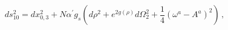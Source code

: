 \begin{equation}
\label{S-metric}
ds^2_{10}= dx^2_{0,3}+N \alpha^\prime g_s \left(d\rho^2+e^{2g(\rho)} d\Omega_2^2
+\frac{1}{4} (\omega^a-A^a)^2\right)\,,
\end{equation}

